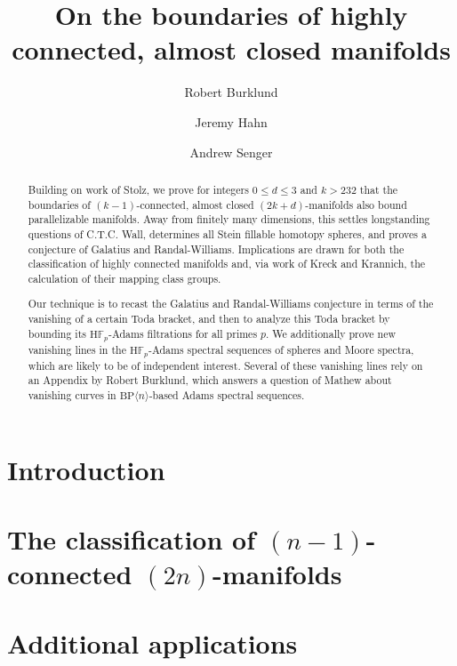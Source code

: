 \documentclass[reqno]{amsart}
\title{On the boundaries of highly connected, almost closed manifolds}
\author{Robert Burklund}
\author{Jeremy Hahn}
\author{Andrew Senger}
\begin{document}
\begin{abstract}
Building on work of Stolz, we prove for integers $0 \le d \le 3$ and $k>232$ that the boundaries of $(k-1)$-connected, almost closed $(2k+d)$-manifolds also bound parallelizable manifolds.
Away from finitely many dimensions, this settles longstanding questions of C.T.C. Wall, determines all Stein fillable homotopy spheres, and proves a conjecture of Galatius and Randal-Williams.
Implications are drawn for both the classification of highly connected manifolds and, via work of Kreck and Krannich, the calculation of their mapping class groups.

Our technique is to recast the Galatius and Randal-Williams conjecture in terms of the vanishing of a certain Toda bracket, and then to analyze this Toda bracket by bounding its $\mathrm{H}\mathbb{F}_p$-Adams filtrations for all primes $p$.
We additionally prove new vanishing lines in the $\mathrm{H}\mathbb{F}_p$-Adams spectral sequences of spheres and Moore spectra, which are likely to be of independent interest. Several of these vanishing lines rely on an Appendix by Robert Burklund, which answers a question of Mathew about vanishing curves in $\mathrm{BP} \langle n \rangle$-based Adams spectral sequences.
\end{abstract}
\maketitle

\tableofcontents
{}


{}
\section{Introduction}


\section{The classification of \texorpdfstring{$(n-1)$}{(n-1)}-connected \texorpdfstring{$(2n)$}{(2n)}-manifolds} \label{sec:classification}

\section{Additional applications} \label{sec:Applications}

\end{document}
